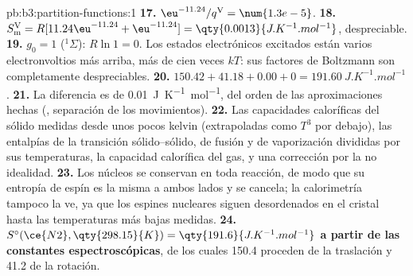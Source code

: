 \begin{solution}{pb:b3:partition-functions:1}
\textbf{17.} $\eu^{-11.24}/q^{\mathrm V} = \num{1.3e-5}$.
\textbf{18.} $S^{\mathrm V}_{\mathrm m} = R[11.24\eu^{-11.24} + \eu^{-11.24}] = \qty{0.0013}{J.K^{-1}.mol^{-1}}$, despreciable.
\textbf{19.} $g_0 = 1$ (${}^1\Sigma$): $R\ln1 = 0$. Los estados electrónicos excitados están varios
electronvoltios más arriba, más de cien veces $kT$: sus factores de Boltzmann son
completamente despreciables.
\textbf{20.} $150.42 + 41.18 + 0.00 + 0 = \qty{191.60}{J.K^{-1}.mol^{-1}}$.
\textbf{21.} La diferencia es de \qty{0.01}{J.K^{-1}.mol^{-1}}, del orden de las
aproximaciones hechas (, separación de los movimientos).
\textbf{22.} Las capacidades caloríficas del sólido medidas desde unos pocos kelvin (extrapoladas
como $T^3$ por debajo), las entalpías de la transición sólido--sólido, de fusión y
de vaporización divididas por sus temperaturas, la capacidad calorífica del gas,
y una corrección por la no idealidad.
\textbf{23.} Los núcleos se conservan en toda reacción, de modo que su entropía de espín es la
misma a ambos lados y se cancela; la calorimetría tampoco la ve, ya que los
espines nucleares siguen desordenados en el cristal hasta las temperaturas más bajas
medidas.
\textbf{24.} \textbf{$S^\circ(\ce{N2}, \qty{298.15}{K}) = \qty{191.6}{J.K^{-1}.mol^{-1}}$ a partir de las constantes espectroscópicas},
de los cuales 150.4 proceden de la traslación y 41.2 de la rotación.
\end{solution}
